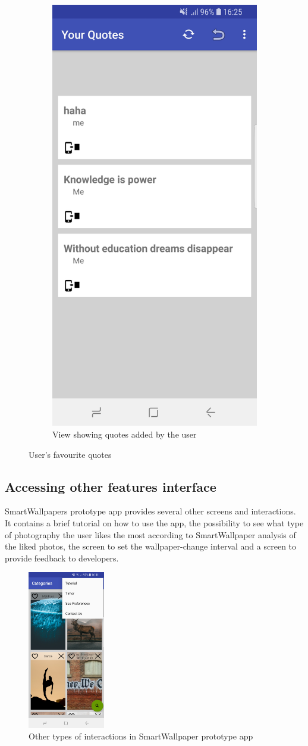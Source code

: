 \documentclass[version=last,fontsize=13pt]{scrartcl}
\begin{document}
\begin{figure}[H]
\begin{subfigure}{.55\textwidth}
  \includegraphics[width=.5\linewidth]{imgs/My_Quotes.jpg}
  \caption{View showing quotes added by the user}
  \label{fig:sub2}
\end{subfigure}
\caption{User's favourite quotes}
\label{fig:usersQuotes}
\end{figure}

\subsection{Accessing other features interface}
	 SmartWallpapers prototype app provides several other screens and interactions. It contains a brief tutorial on how to use the app, the possibility to see what type of photography the user likes the most according to SmartWallpaper analysis of the liked photos, the screen to set the wallpaper-change interval and a screen to provide feedback to developers. 

\begin{figure}[H]
	
	\centering
	\includegraphics[width = 0.3\textwidth]{imgs/Options.jpg}
	\caption*{Other types of interactions in SmartWallpaper prototype app}

\end{figure}
\end{document}
